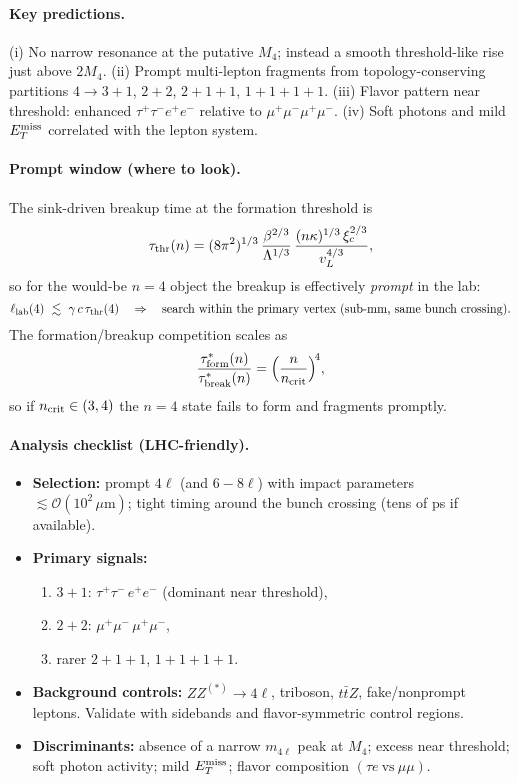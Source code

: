 \paragraph{Key predictions.}
(i) No narrow resonance at the putative \(M_4\); instead a smooth threshold-like rise just above \(2M_4\).
(ii) Prompt multi-lepton fragments from topology-conserving partitions \(4\to 3{+}1\), \(2{+}2\), \(2{+}1{+}1\), \(1{+}1{+}1{+}1\).
(iii) Flavor pattern near threshold: enhanced \(\tau^+\tau^- e^+e^-\) relative to \(\mu^+\mu^-\mu^+\mu^-\).
(iv) Soft photons and mild \(E_T^{\rm miss}\) correlated with the lepton system.

\paragraph{Prompt window (where to look).}
The sink-driven breakup time at the formation threshold is
\[
\tau_{\rm thr}(n)= (8\pi^2)^{1/3}\,\frac{\beta^{2/3}}{\Lambda^{1/3}}\,\frac{(n\kappa)^{1/3}\,\xi_c^{2/3}}{v_L^{4/3}},
\]
so for the would-be \(n{=}4\) object the breakup is effectively \emph{prompt} in the lab:
\[
\ell_{\rm lab}(4)\ \lesssim\ \gamma\,c\,\tau_{\rm thr}(4)\quad\Rightarrow\quad
\text{search within the primary vertex (sub-mm, same bunch crossing).}
\]
The formation/breakup competition scales as
\[
\frac{\tau_{\rm form}^*(n)}{\tau_{\rm break}^*(n)}=\Big(\frac{n}{n_{\rm crit}}\Big)^{\!4},
\]
so if \(n_{\rm crit}\in(3,4)\) the \(n{=}4\) state fails to form and fragments promptly.

\paragraph{Analysis checklist (LHC-friendly).}
\begin{itemize}
  \item \textbf{Selection:} prompt \(4\ell\) (and \(6\!-\!8\ell\)) with impact parameters \(\lesssim\mathcal O(10^2\,\mu\mathrm m)\); tight timing around the bunch crossing (tens of ps if available).
  \item \textbf{Primary signals:}
    \begin{enumerate}
      \item \(3{+}1\): \(\tau^+\tau^-\,e^+e^-\) (dominant near threshold),
      \item \(2{+}2\): \(\mu^+\mu^-\,\mu^+\mu^-\),
      \item rarer \(2{+}1{+}1\), \(1{+}1{+}1{+}1\).
    \end{enumerate}
  \item \textbf{Background controls:} \(ZZ^{(*)}\!\to4\ell\), triboson, \(t\bar t Z\), fake/nonprompt leptons. Validate with sidebands and flavor-symmetric control regions.
  \item \textbf{Discriminants:} absence of a narrow \(m_{4\ell}\) peak at \(M_4\); excess near threshold; soft photon activity; mild \(E_T^{\rm miss}\); flavor composition $(\tau e\ \text{vs}\ \mu\mu)$.
\end{itemize}

